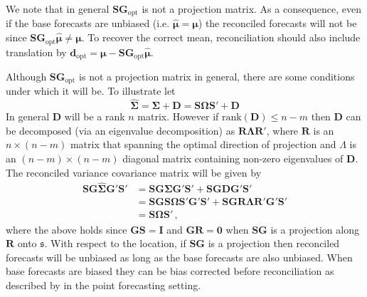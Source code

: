 \documentclass[12pt]{article}
\theoremstyle{definition}
\begin{document}
We note that in general ${\bm S}{\bm G}_{\textrm{opt}}$ is not a projection matrix.  As a consequence, even if the base forecasts are unbiased (i.e. $\hat{\bm{\mu}}=\bm{\mu}$) the reconciled forecasts will not be since ${\bm S}{\bm G}_{\textrm{opt}}\hat{\bm{\mu}}\neq\bm{\mu}$.  To recover the correct mean, reconciliation should also include translation by ${\bm d}_{\textrm{opt}}={\bm\mu}-{\bm S}{\bm G}_{\textrm{opt}}\hat{\bm{\mu}}$.

Although ${\bm S}{\bm G}_{\textrm{opt}}$ is not a projection matrix in general, there are some conditions under which it will be.  To illustrate let
\[
\hat{\bm{\Sigma}}=\bm{\Sigma}+{\bm D}=\bm{S}\bm{\Omega}{\bm{S}}'+{\bm D}
\]
In general ${\bm D}$ will be a rank $n$ matrix.  However if $\textrm{rank}({\bm D})\le n-m$ then ${\bm D}$ can be decomposed (via an eigenvalue decomposition) as ${\bm R}{\bm \Lambda}{\bm R}'$, where ${\bm R}$ is an $n\times (n-m)$ matrix that spanning the optimal direction of projection and $\Lambda$ is an $(n-m)\times (n-m)$ diagonal matrix containing non-zero eigenvalues of ${\bm D}$.  The reconciled variance covariance matrix will be given by
\begin{align}
\bm{S}\bm{G}\hat{\bm{\Sigma}}\bm{G}'\bm{S}'&=\bm{S}\bm{G}\bm{\Sigma}\bm{G}'\bm{S}'+\bm{S}\bm{G}{\bm D}\bm{G}'\bm{S}'\nonumber\\&=\bm{S}\bm{G}\bm{S}\bm{\Omega}{\bm{S}}'\bm{G}'\bm{S}'+\bm{S}\bm{G}{\bm R}{\bm \Lambda}{\bm R}'\bm{G}'\bm{S}'\nonumber\\&=\bm{S}\bm{\Omega}{\bm{S}}'\nonumber\,,
\end{align}
where the above holds since ${\bm G}{\bm S}=\bm{I}$ and ${\bm G}{\bm R}={\bm 0}$ when $\bm{SG}$ is a projection along $\bm R$ onto $\mathfrak{s}$.  With respect to the location, if $\bm{SG}$ is a projection then reconciled forecasts will be unbiased as long as the base forecasts are also unbiased.  When base forecasts are biased they can be bias corrected before reconciliation as described by \cite{PanEtAl2019HF} in the point forecasting setting.

\end{document}
